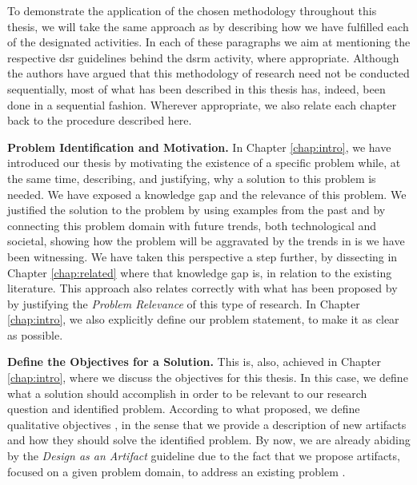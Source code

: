 To demonstrate the application of the chosen methodology throughout this thesis, we will take the same approach as \citeauthor{peffers_design_2007} \cite{peffers_design_2007} by describing how we have fulfilled each of the designated activities. In each of these paragraphs we aim at mentioning the respective \gls{dsr} guidelines behind the \gls{dsrm} activity, where appropriate. Although the authors have argued that this methodology of research need not be conducted sequentially, most of what has been described in this thesis has, indeed, been done in a sequential fashion. Wherever appropriate, we also relate each chapter back to the procedure described here.

\textbf{Problem Identification and Motivation.} In Chapter \ref{chap:intro}, we have introduced our thesis by motivating the existence of a specific problem while, at the same time, describing, and justifying, why a solution to this problem is needed. We have exposed a knowledge gap and the relevance of this problem. We justified the solution to the problem by using examples from the past and by connecting this problem domain with future trends, both technological and societal, showing how the problem will be aggravated by the trends in \gls{is} we have been witnessing. We have taken this perspective a step further, by dissecting in Chapter \ref{chap:related} where that knowledge gap is, in relation to the existing literature. This approach also relates correctly with what has been proposed by \citeauthor{hevner_design_2004} \cite{hevner_design_2004} by justifying the \textit{Problem Relevance} of this type of research. In Chapter \ref{chap:intro}, we also explicitly define our problem statement, to make it as clear as possible.

\textbf{Define the Objectives for a Solution.} This is, also, achieved in Chapter \ref{chap:intro}, where we discuss the objectives for this thesis. In this case, we define what a solution should accomplish in order to be relevant to our research question and identified problem. According to what \citeauthor{peffers_design_2007} \cite{peffers_design_2007} proposed, we define qualitative objectives \cite[13]{peffers_design_2007}, in the sense that we provide a description of new artifacts and how they should solve the identified problem. By now, we are already abiding by the \textit{Design as an Artifact} guideline \cite{hevner_design_2004} due to the fact that we propose artifacts, focused on a given problem domain, to address an existing problem \cite[82]{hevner_design_2004}.

